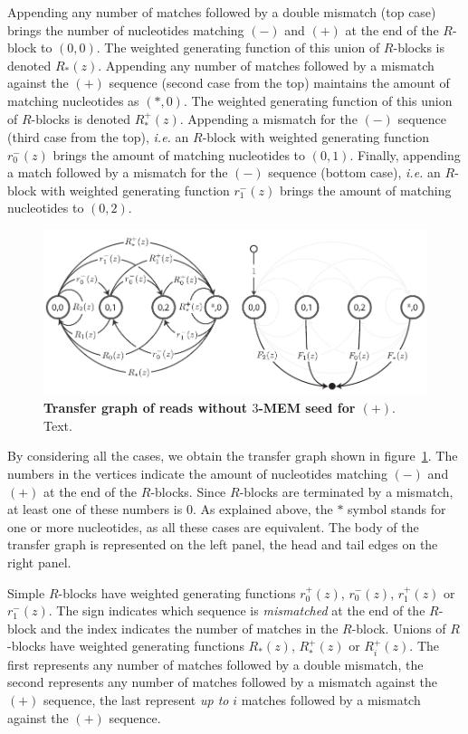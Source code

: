 \documentclass{article}
\begin{document}
Appending any number of matches followed by a double mismatch (top case)
brings the number of nucleotides matching $(-)$ and $(+)$ at the end of
the $R$-block to $(0,0)$. The weighted generating function of this union
of $R$-blocks is denoted $R_*(z)$. Appending any number of matches
followed by a mismatch against the $(+)$ sequence (second case from the
top) maintains the amount of matching nucleotides as $(*,0)$. The weighted
generating function of this union of $R$-blocks is denoted $R_*^+(z)$.
Appending a mismatch for the $(-)$ sequence (third case from the top),
\textit{i.e.} an $R$-block with weighted generating function $r_0^-(z)$
brings the amount of matching nucleotides to $(0,1)$. Finally, appending a
match followed by a mismatch for the $(-)$ sequence (bottom case),
\textit{i.e.} an $R$-block with weighted generating function $r_1^-(z)$
brings the amount of matching nucleotides to $(0,2)$.



\begin{figure}[h]
\centering
\includegraphics[scale=0.79]{MEM_graph.pdf}
\caption{\textbf{Transfer graph of reads without $3$-MEM seed for $(+)$}.
Text.}
\label{fig:graph_mem}
\end{figure}


By considering all the cases, we obtain the transfer graph shown in
figure~\ref{fig:graph_mem}. The numbers in the vertices indicate the
amount of nucleotides matching $(-)$ and $(+)$ at the end of the
$R$-blocks. Since $R$-blocks are terminated by a mismatch, at least one of
these numbers is $0$. As explained above, the $*$ symbol stands for one or
more nucleotides, as all these cases are equivalent. The body of the
transfer graph is represented on the left panel, the head and tail edges
on the right panel.

Simple $R$-blocks have weighted generating functions $r_0^+(z)$,
$r_0^-(z)$, $r_1^+(z)$ or $r_1^-(z)$. The sign indicates which sequence
is \emph{mismatched} at the end of the $R$-block and the index indicates
the number of matches in the $R$-block. Unions of $R$-blocks have weighted
generating functions $R_*(z)$, $R_*^+(z)$ or $R_i^+(z)$. The first
represents any number of matches followed by a double mismatch, the second
represents any number of matches followed by a mismatch against the $(+)$
sequence, the last represent \emph{up to} $i$ matches followed by a
mismatch against the $(+)$ sequence.
\end{document}
